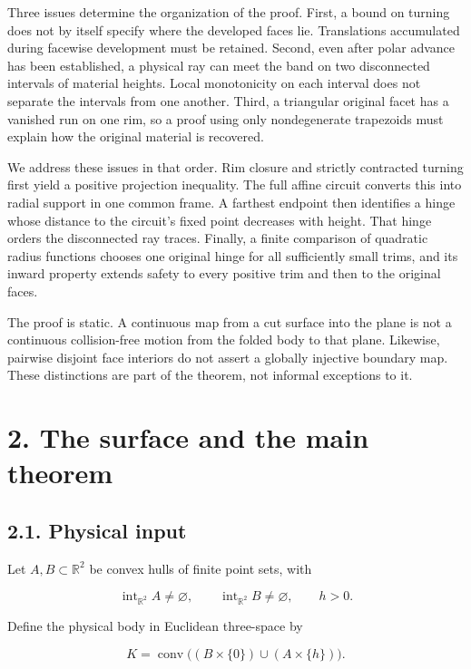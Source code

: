 \documentclass[
  11pt,
  letterpaper,
]{article}
\begin{document}
Three issues determine the organization of the proof. First, a bound on
turning does not by itself specify where the developed faces lie.
Translations accumulated during facewise development must be retained.
Second, even after polar advance has been established, a physical ray
can meet the band on two disconnected intervals of material heights.
Local monotonicity on each interval does not separate the intervals from
one another. Third, a triangular original facet has a vanished run on
one rim, so a proof using only nondegenerate trapezoids must explain how
the original material is recovered.

We address these issues in that order. Rim closure and strictly
contracted turning first yield a positive projection inequality. The
full affine circuit converts this into radial support in one common
frame. A farthest endpoint then identifies a hinge whose distance to the
circuit's fixed point decreases with height. That hinge orders the
disconnected ray traces. Finally, a finite comparison of quadratic
radius functions chooses one original hinge for all sufficiently small
trims, and its inward property extends safety to every positive trim and
then to the original faces.

The proof is static. A continuous map from a cut surface into the plane
is not a continuous collision-free motion from the folded body to that
plane. Likewise, pairwise disjoint face interiors do not assert a
globally injective boundary map. These distinctions are part of the
theorem, not informal exceptions to it.

\section{2. The surface and the main
theorem}\label{the-surface-and-the-main-theorem}

\subsection{2.1. Physical input}\label{physical-input}

Let \(A,B\subset\mathbb R^2\) be convex hulls of finite point sets, with

\[
\operatorname{int}_{\mathbb R^2}A\ne\varnothing,
\qquad
\operatorname{int}_{\mathbb R^2}B\ne\varnothing,
\qquad h>0.
\]

Define the physical body in Euclidean three-space by

\[
K=\operatorname{conv}\bigl((B\times\{0\})\cup(A\times\{h\})\bigr).
\tag{2.1}
\]
\end{document}
